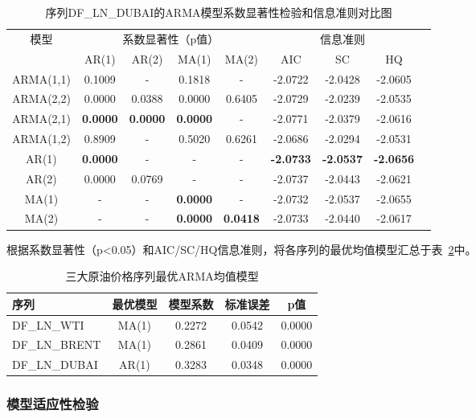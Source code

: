 \documentclass[12pt,a4paper]{ctexart}
\begin{document}
\begin{table}[H]
\centering
\caption{序列DF\_LN\_DUBAI的ARMA模型系数显著性检验和信息准则对比图}
\label{tab:arma_pvalue_dubai}
\setlength{\tabcolsep}{4pt}  %
\begin{tabular}{cccccc ccc}
\toprule[1.2pt]
\multirow{2}{*}{模型} & \multicolumn{4}{c}{系数显著性（p值）} & \multicolumn{3}{c}{信息准则} \\
\cmidrule(lr){2-5} \cmidrule(lr){6-8}
& AR(1) & AR(2) & MA(1) & MA(2) & AIC & SC & HQ \\
\midrule[0.75pt]
ARMA(1,1) & 0.1009 & - & 0.1818 & - & -2.0722 & -2.0428 & -2.0605 \\
ARMA(2,2) & 0.0000 & 0.0388 & 0.0000 & 0.6405 & -2.0729 & -2.0239 & -2.0535 \\
ARMA(2,1) & \textbf{0.0000} & \textbf{0.0000} & \textbf{0.0000} & - & -2.0771 & -2.0379 & -2.0616 \\
ARMA(1,2) & 0.8909 & - & 0.5020 & 0.6261 & -2.0686 & -2.0294 & -2.0531 \\
AR(1) & \textbf{0.0000} & - & - & - & \textbf{-2.0733} & \textbf{-2.0537} & \textbf{-2.0656} \\
AR(2) & 0.0000 & 0.0769 & - & - & -2.0737 & -2.0443 & -2.0621 \\
MA(1) & - & - & \textbf{0.0000} & - & -2.0732 & -2.0537 & -2.0655 \\
MA(2) & - & - & \textbf{0.0000} & \textbf{0.0418} & -2.0733 & -2.0440 & -2.0617 \\
\bottomrule[1.2pt]
\end{tabular}
\end{table}

根据系数显著性（p<0.05）和AIC/SC/HQ信息准则，将各序列的最优均值模型汇总于表~\ref{tab:best_arma_all}中。

\begin{table}[H]
\centering
\caption{三大原油价格序列最优ARMA均值模型}
\label{tab:best_arma_all}
\begin{tabular}{lcccc}
\toprule
序列 & 最优模型 & 模型系数 & 标准误差 & p值 \\
\midrule
DF\_LN\_WTI   & MA(1) & 0.2272 & 0.0542 & 0.0000 \\
DF\_LN\_BRENT & MA(1) & 0.2861 & 0.0409 & 0.0000 \\
DF\_LN\_DUBAI & AR(1) & 0.3283 & 0.0348 & 0.0000 \\
\bottomrule
\end{tabular}
\end{table}


\subsubsection{模型适应性检验}
\end{document}

